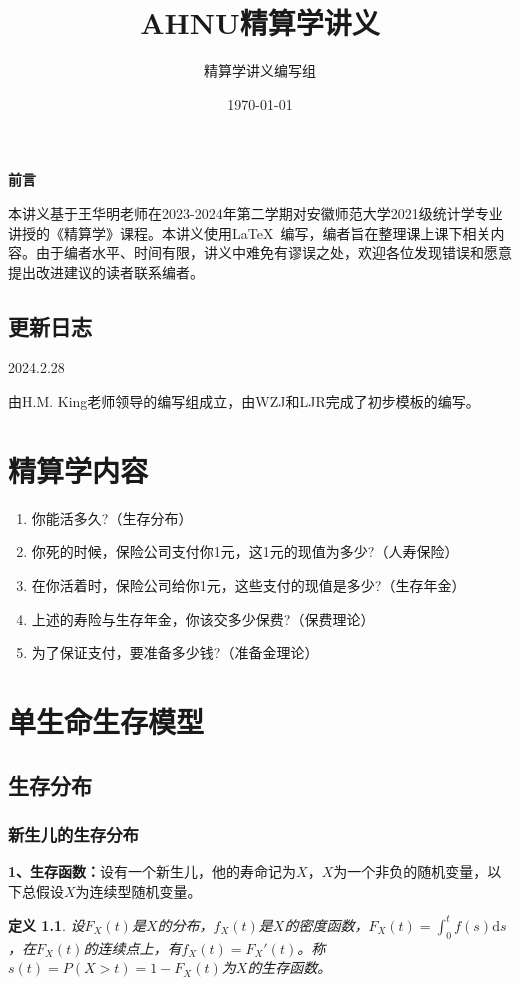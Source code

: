 \documentclass[12pt, a4paper, oneside]{ctexbook}
\newtheorem{definition}[theorem]{定义}
\begin{document}

\newpage
\title{{\Huge{\textbf{AHNU精算学讲义}}\\}}
\author{精算学讲义编写组}
\date{\today}



\setcounter{page}{1}



\begin{center}
    \Huge\textbf{前言}
\end{center}
\par 本讲义基于王华明老师在2023-2024年第二学期对安徽师范大学2021级统计学专业讲授的《精算学》课程。本讲义使用\LaTeX\ 编写，编者旨在整理课上课下相关内容。由于编者水平、时间有限，讲义中难免有谬误之处，欢迎各位发现错误和愿意提出改进建议的读者联系编者。

\newpage
\tableofcontents
\newpage
{}
\setcounter{page}{1}



\newpage
\section*{更新日志}
2024.2.28

由H.M. King老师领导的编写组成立，由WZJ和LJR完成了初步模板的编写。

\chapter*{精算学内容}
\begin{enumerate}[1、]
    \item 你能活多久?（生存分布）
    \item 你死的时候，保险公司支付你1元，这1元的现值为多少?（人寿保险）
    \item 在你活着时，保险公司给你1元，这些支付的现值是多少?（生存年金）
    \item 上述的寿险与生存年金，你该交多少保费?（保费理论）
    \item 为了保证支付，要准备多少钱?（准备金理论）
\end{enumerate}

\chapter{单生命生存模型}
\section{生存分布}
\subsection{新生儿的生存分布}
\textbf{1、生存函数：}设有一个新生儿，他的寿命记为$X$，$X$为一个非负的随机变量，以下总假设$X$为连续型随机变量。
\begin{definition}
    设$F_X(t)$是$X$的分布，$f_X(t)$是$X$的密度函数，$F_X(t) = \int_0^t f(s)\mathrm{d}s$，在$F_X(t)$的连续点上，有$f_X(t) = F_X'(t)$。称$s(t) = P(X > t) = 1 - F_X(t)$为$X$的生存函数。
\end{definition}
\end{document}
